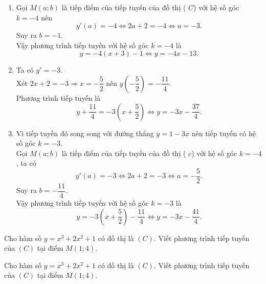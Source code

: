 \begin{ex}
{\begin{enumerate}
			\item Gọi $ M(a; b) $ là tiếp điểm của tiếp tuyến của đồ thị ( $ C $) với hệ số góc $ k=-4 $ nên 
			 \[
			 y'(a)=-4 \Leftrightarrow 2 a+2=-4 \Leftrightarrow a=-3.
			\] 
			Suy ra  $b=-1$.\\
			Vậy phương  trình tiếp tuyến với hệ số góc $ k=-4 $ là $$ y=-4(x+3)-1 \Leftrightarrow y=-4 x-13.$$
			\item Ta có $y'  = -3$.\\
			Xét $2x+2 = -3 \Rightarrow x = -\dfrac{5}{2}$ nên $y\left(-\dfrac{5}{2}\right) =  -\dfrac{11}{4}$.\\
			Phương trình tiếp tuyến là $$y + \dfrac{11}{4} = -3\left(x+\dfrac{5}{2}\right) \Leftrightarrow y = -3x -  \dfrac{37}{4}.$$
			\item Vì tiếp tuyến đó song song với đưởng thẳng $ y=1-3 x $ nên tiếp tuyến có  hệ số góc $ k=-3 $.\\
			Gọi $ M(a; b) $ là tiếp điểm của tiếp tuyến của đồ thị ( $ c $) với hệ số góc $ k=-4 $, ta có 
			\[ 
			y'(a)=-3  \Leftrightarrow 2 a+2=-3 \Leftrightarrow a=-\dfrac{5}{2}.
			\] 
			Suy ra $b=-\dfrac{11}{4}$.\\ 
			Vậy phương trình tiếp  tuyến với hệ số góc $ k=-3 $ là $$ y=-3\left(x+\dfrac{5}{2}\right)-\dfrac{11}{4} \Leftrightarrow y=-3 x-\dfrac{41}{4}.$$
		\end{enumerate}
	} 
\end{ex}

\begin{bt}%
	Cho hàm số $y = x^3 + 2x^2+1$ có đồ thị  là $(C)$. Viết phương trình tiếp tuyến của $(C)$ tại điểm $M(1; 4)$.
\end{bt}

\begin{ex}%
	Cho hàm số $y = x^3  + 2x^2+1$ có đồ thị là $(C)$. Viết phương trình tiếp tuyến của $(C)$ tại điểm $M(1; 4)$.
\end{ex}

